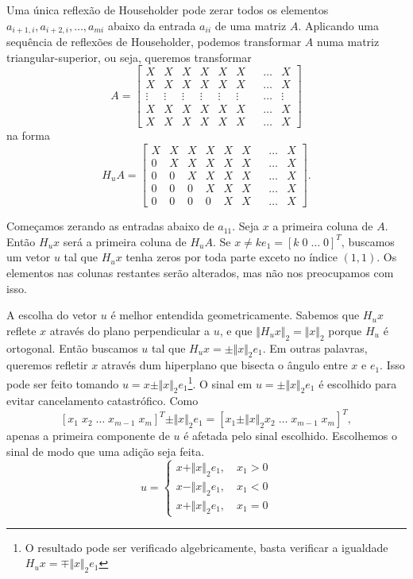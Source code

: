\documentclass{article}
\begin{document}
Uma única reflexão de Householder pode zerar todos os elementos \(a_{i+1,i}, a_{i+2,i}, \ldots, a_{mi}\) abaixo da entrada \(a_{ii}\) de uma matriz \(A\). Aplicando uma sequência de reflexões de Householder, podemos transformar \(A\) numa matriz triangular-superior, ou seja, queremos transformar
\[
    A = \begin{bmatrix}
        X & X & X & X & X & X & & \ldots & X \\
        X & X & X & X & X & X & & \ldots & X \\
        \vdots & \vdots & \vdots & \vdots & \vdots & \vdots & & \ldots & \vdots \\
        X & X & X & X & X & X & & \ldots & X \\
        X & X & X & X & X & X & & \ldots & X
    \end{bmatrix}
\]
na forma
\[
    H_uA = \begin{bmatrix}
        X & X & X & X & X & X & & \ldots & X \\
        0 & X & X & X & X & X & & \ldots & X \\
        0 & 0 & X & X & X & X & & \ldots & X \\
        0 & 0 & 0 & X & X & X & & \ldots & X \\
        0 & 0 & 0 & 0 & X & X & & \ldots & X
    \end{bmatrix}.
\]

Começamos zerando as entradas abaixo de \(a_{11}\). Seja \(x\) a primeira coluna de \(A\). Então \(H_ux\) será a primeira coluna de \(H_uA\). Se \(x \neq ke_1 = [k \; 0 \; \ldots \; 0]^T\), buscamos um vetor \(u\) tal que \(H_ux\) tenha zeros por toda parte exceto no índice \((1,1)\). Os elementos nas colunas restantes serão alterados, mas não nos preocupamos com isso.

A escolha do vetor \(u\) é melhor entendida geometricamente. Sabemos que \(H_ux\) reflete \(x\) através do plano perpendicular a \(u\), e que \(\Vert H_ux \Vert_2 = \Vert x \Vert_2\) porque \(H_u\) é ortogonal. Então buscamos \(u\) tal que \(H_ux = \pm \Vert x \Vert_2 e_1\). Em outras palavras, queremos refletir \(x\) através dum hiperplano que bisecta o ângulo entre \(x\) e \(e_1\). Isso pode ser feito tomando \(u = x \pm \Vert x \Vert_2 e_1\)\footnote{O resultado pode ser verificado algebricamente, basta verificar a igualdade \(H_ux = \mp \Vert x \Vert_2 e_1\)}. O sinal em \(u = \pm \Vert x \Vert_2 e_1\) é escolhido para evitar cancelamento catastrófico. Como
\[
    [x_1 \; x_2 \; \ldots \; x_{m-1} \; x_m]^T \pm \Vert x \Vert_2 e_1 = [x_1 \pm \Vert x \Vert_2 x_2 \; \ldots \; x_{m-1} \; x_m]^T,
\]
apenas a primeira componente de \(u\) é afetada pelo sinal escolhido. Escolhemos o sinal de modo que uma adição seja feita.
\[
    u = \begin{cases}
        x + \Vert x \Vert_2 e_1, \quad x_1 > 0 \\
        x - \Vert x \Vert_2 e_1, \quad x_1 < 0 \\
        x + \Vert x \Vert_2 e_1, \quad x_1 = 0
    \end{cases}
\]
\end{document}
